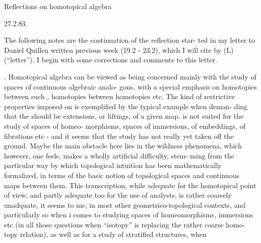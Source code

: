 
Reflections on homotopical algebra

27.2.83.

\margin{\unsure{\#}} The following notes are the continuation of the reflection star-%
ted in my letter to Daniel Quillen written previous week (19.2 - 23.2),
which I will cite by (L) (``letter''). I begin with some corrections and
comments to this letter.

. Homotopical algebra can be viewed as being concerned mainly with
the study of spaces of continuous    algebraic analo-%
gons,   with a special emphasis on homotopies between such ,
homotopies between homotopies etc. The kind of restrictive properties
imposed on   is exemplified by the typical example when deman-%
ding that the    should be extensions, or liftings, of
a given  map.   is not  suited for the study of spaces of homeo-%
morphisms, spaces of immersions, of embeddings, of fibrations etc
- and it seems that the  study  has not really yet taken off the
ground. Maybe the main obstacle here lies in the wildness phenomena,
which however, one feels, makes a wholly artificial difficulty, stem-%
ming from the particular way by which topological intuition has been
mathematically formalized, in terms of the basic notion of topological
spaces and continuous maps between them. This transcription, while
adequate for the homotopical point of view, and partly adequate too
for the use of analysts, is rather coarsely unadquate, it seems to me,
in most other geometrico-topological contexts, and particularly so when
i comes to studying spaces of homeomorphisms, immersions etc (in all
those questions when  ``isotopy'' is replacing the rather coarse homo-%
topy relation), as well as for a study of stratified structures, when

